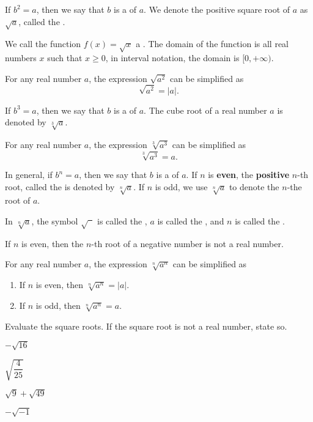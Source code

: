 
\begin{tcolorbox}[title={Radical expressions}]
If $b^2=a$, then we say that $b$ is a  of $a$. We denote the positive square root of $a$ as $\sqrt{a}$, called the .

We call the function $f(x)=\sqrt{x}$ a . The domain of the function is all real numbers $x$ such that $x\ge 0$, in interval notation, the domain is $[0,+\infty)$. 

For any real number $a$, the expression $\sqrt{a^2}$ can be simplified as
\[\sqrt{a^2}=|a|.\]

If $b^3=a$, then we say that $b$ is a  of $a$. The cube root of a real number $a$ is denoted by $\sqrt[3]{a}$.

For any real number $a$, the expression $\sqrt[3]{a^3}$ can be simplified as
\[\sqrt[3]{a^3}=a.\]

In general, if $b^n=a$, then we say that $b$ is a  of $a$.  If $n$ is \textbf{even}, the \textbf{positive} $n$-th root, called the  is denoted by $\sqrt[n]{a}$. If $n$ is odd, we use $\sqrt[n]{a}$ to denote the $n$-the root of $a$. 

In $\sqrt[n]{a}$, the symbol $\sqrt{\phantom{a}}$ is called the , $a$ is called  the , and $n$ is called the .

If $n$ is even, then the $n$-th root of a negative number is not a real number.

For any real number $a$, the expression $\sqrt[n]{a^n}$ can be simplified as
\begin{enumerate}
\item If $n$ is even, then $\sqrt[n]{a^n}=|a|$.
\item If $n$ is odd, then $\sqrt[n]{a^n}=a$.
\end{enumerate}
\end{tcolorbox}

\begin{exercise}
Evaluate the square roots. If the square root is not a real number, state so.
\\
\begin{enumerate*}[label={(\arabic*)~}]
\item $-\sqrt{16}$%
\item $\sqrt{\dfrac{4}{25}}$%
\item $\sqrt{9}+\sqrt{49}$ %
\item $-\sqrt{-1}$\hfill\null\null
\end{enumerate*}
\end{exercise}



